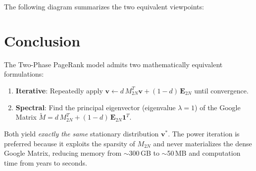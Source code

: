 \documentclass[11pt,a4paper]{article}
\theoremstyle{definition}
\begin{document}
The following diagram summarizes the two equivalent viewpoints:

\begin{center}
\end{center}

\section{Conclusion}

The Two-Phase PageRank model admits two mathematically equivalent
formulations:

\begin{enumerate}
  \item \textbf{Iterative}: Repeatedly apply $\bm{v} \leftarrow
        d\,M_{2N}^T\bm{v} + (1-d)\,\bm{E}_{2N}$ until convergence.
  \item \textbf{Spectral}: Find the principal eigenvector (eigenvalue
        $\lambda = 1$) of the Google Matrix
        $\widetilde{M} = d\,M_{2N}^T + (1-d)\,\bm{E}_{2N}\bm{1}^T$.
\end{enumerate}

Both yield \emph{exactly the same} stationary distribution $\bm{v}^*$.
The power iteration is preferred because it exploits the sparsity of
$M_{2N}$ and never materializes the dense Google Matrix, reducing
memory from $\sim$300\,GB to $\sim$50\,MB and computation time from
years to seconds.
\end{document}
